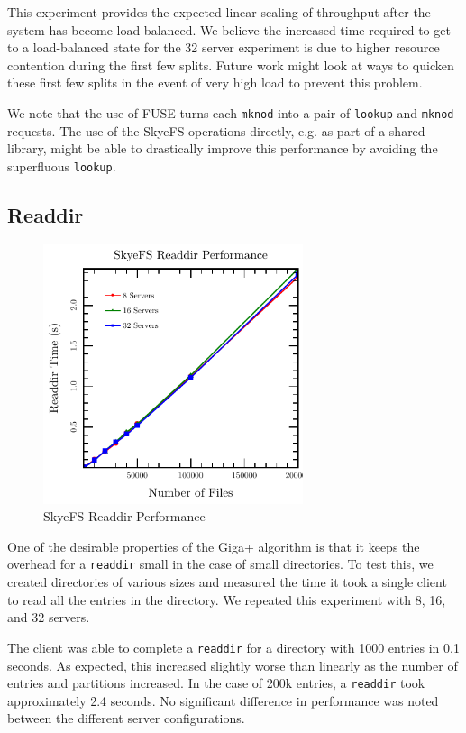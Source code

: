 \documentclass[twocolumn,letterpaper]{article}
\newcommand{\code}[1]{\texttt{#1}}
\begin{document}
This experiment provides the expected linear scaling of throughput after the
system has become load balanced.  We believe the increased time required to
get to a load-balanced state for the 32 server experiment is due to higher
resource contention during the first few splits.  Future work might look at
ways to quicken these first few splits in the event of very high load to
prevent this problem.

We note that the use of FUSE turns each \code{mknod} into a pair of
\code{lookup} and \code{mknod} requests.  The use of the SkyeFS operations
directly, e.g. as part of a shared library, might be able to drastically
improve this performance by avoiding the superfluous \code{lookup}.

\subsection{Readdir}
\begin{figure}
\begin{center}
\includegraphics[width=3in]{graph-readdir}
\end{center}
\caption{SkyeFS Readdir Performance}
\end{figure}
One of the desirable properties of the Giga+ algorithm is that it keeps the
overhead for a \code{readdir} small in the case of small directories.  To test
this, we created directories of various sizes and measured the time it took a
single client to read all the entries in the directory.  We repeated this
experiment with 8, 16, and 32 servers.

The client was able to complete a \code{readdir} for a directory with 1000
entries in 0.1 seconds.  As expected, this increased slightly worse than
linearly as the number of entries and partitions increased.  In the case of
200k entries, a \code{readdir} took approximately 2.4 seconds.  No significant
difference in performance was noted between the different server
configurations.
\end{document}
